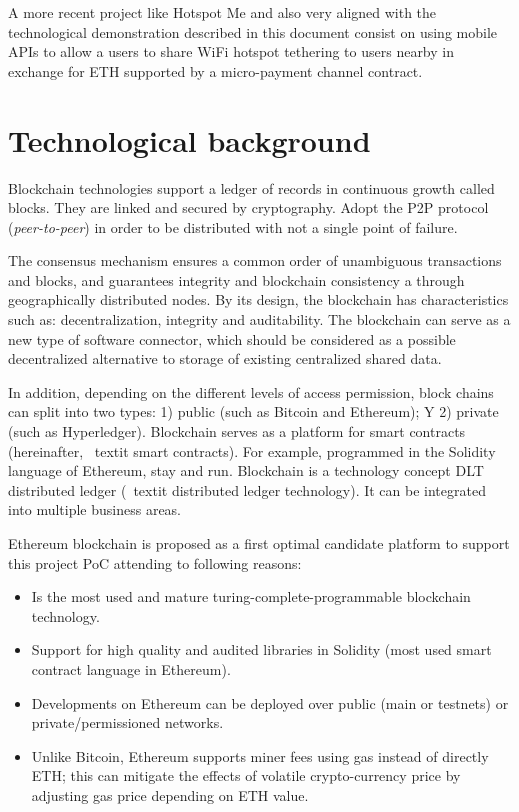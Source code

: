 \documentclass[12pt]{amsart}
\begin{document}
\begin{multicols}{2}
\vspace{0.35cm}

A more recent project like Hotspot Me\cite{hotspotme}
and also very aligned with the technological demonstration
described in this document consist on using mobile
APIs to allow a users to share WiFi hotspot tethering
to users nearby in exchange for ETH supported by a
micro-payment channel contract.


\section{Technological background}\label{ch:bc}

\vspace{0.35cm}

Blockchain technologies support a ledger of records in
continuous growth called blocks.
They are linked and secured by
cryptography. Adopt the P2P protocol
(\textit{peer-to-peer}) in order to be distributed
with not a single point of failure.

\vspace{0.35cm}

The consensus mechanism ensures a common order
of unambiguous transactions and
blocks, and guarantees integrity and
blockchain consistency a
through geographically distributed nodes.
By its design, the blockchain has characteristics
such as: decentralization, integrity and auditability.
The blockchain can serve as a new
type of software connector, which should be considered
as a possible decentralized alternative to storage
of existing centralized shared data.

\vspace{0.35cm}

In addition, depending on the different levels of
access permission, block chains can
split into two types:
1) public (such as Bitcoin and Ethereum); Y
2) private (such as Hyperledger). Blockchain serves
as a platform for smart contracts
(hereinafter, \ textit {smart contracts}).
For example, programmed in the Solidity language of
Ethereum, stay and run.
Blockchain is a technology concept
DLT distributed ledger
(\ textit {distributed ledger technology}).
It can be integrated into multiple business areas.


Ethereum
blockchain is proposed as a first optimal candidate platform
to support this project PoC attending to
following reasons:

\begin{itemize}
\item Is the most used and mature
turing-complete-programmable blockchain technology.
\item Support for high quality and audited
libraries in Solidity (most used smart contract language in Ethereum).
\item Developments on Ethereum can be deployed
over public (main or testnets) or private/permissioned networks.
\item Unlike Bitcoin, Ethereum supports miner fees using gas
instead of directly ETH; this can mitigate the effects of
volatile crypto-currency price by adjusting gas price depending
on ETH value.
\end{itemize}


\end{multicols}
\end{document}
